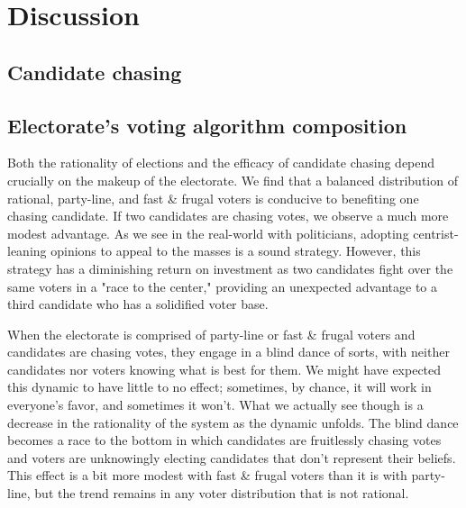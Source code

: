 \section{Discussion}
\label{sec:discussion}


\subsection{Candidate chasing}


\subsection{Electorate's voting algorithm composition}


Both the rationality of elections and the efficacy of candidate chasing depend
crucially on the makeup of the electorate. We find that a balanced distribution
of rational, party-line, and fast \& frugal voters is conducive to benefiting
one chasing candidate. If two candidates are chasing votes, we observe a much
more modest advantage. As we see in the real-world with politicians, adopting
centrist-leaning opinions to appeal to the masses is a sound strategy. However, 
this strategy has a diminishing return on investment as two candidates fight over
the same voters in a "race to the center," providing an unexpected advantage to
a third candidate who has a solidified voter base.

When the electorate is comprised of party-line or fast \& frugal voters and
candidates are chasing votes, they engage in a blind dance of sorts, with
neither candidates nor voters knowing what is best for them. We might have
expected this dynamic to have little to no effect; sometimes, by chance,
it will work in everyone's favor, and sometimes it won't. What we actually
see though is a decrease in the rationality of the system as the dynamic
unfolds. The blind dance becomes a race to the bottom in which candidates
are fruitlessly chasing votes and voters are unknowingly electing candidates
that don't represent their beliefs. This effect is a bit more modest with
fast \& frugal voters than it is with party-line, but the trend remains
in any voter distribution that is not rational.

